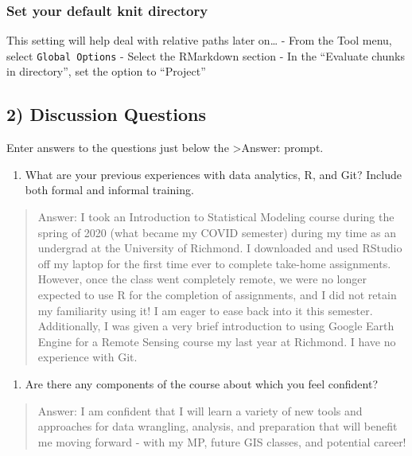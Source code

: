 \documentclass[
]{article}
\providecommand{\tightlist}{%
  \setlength{\itemsep}{0pt}\setlength{\parskip}{0pt}}
\begin{document}
\hypertarget{set-your-default-knit-directory}{%
\subsubsection{Set your default knit
directory}\label{set-your-default-knit-directory}}

This setting will help deal with relative paths later on\ldots{} - From
the Tool menu, select \texttt{Global\ Options} - Select the RMarkdown
section - In the ``Evaluate chunks in directory'', set the option to
``Project''

\hypertarget{discussion-questions}{%
\subsection{2) Discussion Questions}\label{discussion-questions}}

Enter answers to the questions just below the \textgreater Answer:
prompt.

\begin{enumerate}
\def\labelenumi{\arabic{enumi}.}
\tightlist
\item
  What are your previous experiences with data analytics, R, and Git?
  Include both formal and informal training.
\end{enumerate}

\begin{quote}
Answer: I took an Introduction to Statistical Modeling course during the
spring of 2020 (what became my COVID semester) during my time as an
undergrad at the University of Richmond. I downloaded and used RStudio
off my laptop for the first time ever to complete take-home assignments.
However, once the class went completely remote, we were no longer
expected to use R for the completion of assignments, and I did not
retain my familiarity using it! I am eager to ease back into it this
semester. Additionally, I was given a very brief introduction to using
Google Earth Engine for a Remote Sensing course my last year at
Richmond. I have no experience with Git.
\end{quote}

\begin{enumerate}
\def\labelenumi{\arabic{enumi}.}
\setcounter{enumi}{1}
\tightlist
\item
  Are there any components of the course about which you feel confident?
\end{enumerate}

\begin{quote}
Answer: I am confident that I will learn a variety of new tools and
approaches for data wrangling, analysis, and preparation that will
benefit me moving forward - with my MP, future GIS classes, and
potential career!
\end{quote}
\end{document}
